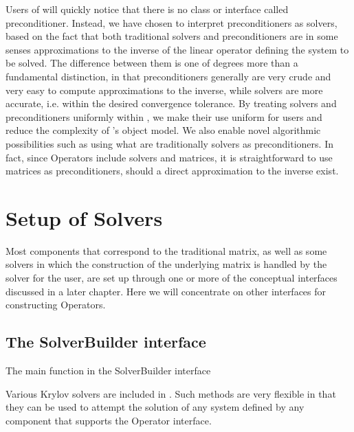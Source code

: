 Users of \hypre{} will quickly notice that there is
no class or interface called 
preconditioner. Instead, we have chosen to interpret preconditioners as
solvers, based on the fact that 
both traditional solvers and preconditioners are in some senses approximations
to the inverse of the linear 
operator defining the system to be solved. The difference between them is one
of degrees more than a fundamental distinction, in that 
preconditioners generally are very crude and very easy to compute
approximations to the inverse, while 
solvers are more accurate, i.e. within the desired convergence tolerance. By
treating solvers and 
preconditioners uniformly within \hypre{}, we make their use uniform for users and
reduce the complexity 
of \hypre{}'s object model. We also enable novel algorithmic possibilities such as
using what are 
traditionally solvers as preconditioners. In fact, since Operators include
solvers and matrices, it is 
straightforward to use matrices as preconditioners, should a direct
approximation to the inverse exist. 

\section{Setup of Solvers}

Most components that correspond to the traditional matrix, as well as
some solvers in which the 
construction of the underlying matrix is handled by the solver for the user,
are set up through one or more 
of the conceptual interfaces discussed in a later chapter. Here we will
concentrate on other interfaces for
constructing Operators.

\subsection{The SolverBuilder interface}

The main function in the SolverBuilder interface


Various Krylov solvers are included in \hypre{}.
Such methods are very flexible in that they can be used to attempt
the solution of any system defined by any component that supports the
Operator interface.

